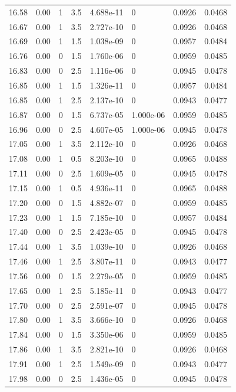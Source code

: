 \documentclass[preview]{standalone}
\begin{document}
{{{{{{{{\begin{tabular}{L{1.2cm}C{1.2cm} C{0.3cm}C{0.5cm} C{1.4cm}C{1.4cm} C{1.4cm}C{1.4cm}}
  16.58  &  0.00  & 1     & 3.5 &  4.688e-11  & 0  & 0.0926 &  0.0468   \\ 
  16.67  &  0.00  & 1     & 3.5 &  2.727e-10  & 0  & 0.0926 &  0.0468   \\ 
  16.69  &  0.00  & 1     & 1.5 &  1.038e-09  & 0  & 0.0957 &  0.0484   \\ 
  16.76  &  0.00  & 0     & 1.5 &  1.760e-06  & 0  & 0.0959 &  0.0485   \\ 
  16.83  &  0.00  & 0     & 2.5 &  1.116e-06  & 0  & 0.0945 &  0.0478   \\ 
  16.85  &  0.00  & 1     & 1.5 &  1.326e-11  & 0  & 0.0957 &  0.0484   \\ 
  16.85  &  0.00  & 1     & 2.5 &  2.137e-10  & 0  & 0.0943 &  0.0477   \\ 
  16.87  &  0.00  & 0     & 1.5 &  6.737e-05  & 1.000e-06  & 0.0959 &  0.0485   \\ 
  16.96  &  0.00  & 0     & 2.5 &  4.607e-05  & 1.000e-06  & 0.0945 &  0.0478   \\ 
  17.05  &  0.00  & 1     & 3.5 &  2.112e-10  & 0  & 0.0926 &  0.0468   \\ 
  17.08  &  0.00  & 1     & 0.5 &  8.203e-10  & 0  & 0.0965 &  0.0488   \\ 
  17.11  &  0.00  & 0     & 2.5 &  1.609e-05  & 0  & 0.0945 &  0.0478   \\ 
  17.15  &  0.00  & 1     & 0.5 &  4.936e-11  & 0  & 0.0965 &  0.0488   \\ 
  17.20  &  0.00  & 0     & 1.5 &  4.882e-07  & 0  & 0.0959 &  0.0485   \\ 
  17.23  &  0.00  & 1     & 1.5 &  7.185e-10  & 0  & 0.0957 &  0.0484   \\ 
  17.40  &  0.00  & 0     & 2.5 &  2.423e-05  & 0  & 0.0945 &  0.0478   \\ 
  17.44  &  0.00  & 1     & 3.5 &  1.039e-10  & 0  & 0.0926 &  0.0468   \\ 
  17.46  &  0.00  & 1     & 2.5 &  3.807e-11  & 0  & 0.0943 &  0.0477   \\ 
  17.56  &  0.00  & 0     & 1.5 &  2.279e-05  & 0  & 0.0959 &  0.0485   \\ 
  17.65  &  0.00  & 1     & 2.5 &  5.185e-11  & 0  & 0.0943 &  0.0477   \\ 
  17.70  &  0.00  & 0     & 2.5 &  2.591e-07  & 0  & 0.0945 &  0.0478   \\ 
  17.80  &  0.00  & 1     & 3.5 &  3.666e-10  & 0  & 0.0926 &  0.0468   \\ 
  17.84  &  0.00  & 0     & 1.5 &  3.350e-06  & 0  & 0.0959 &  0.0485   \\ 
  17.86  &  0.00  & 1     & 3.5 &  2.821e-10  & 0  & 0.0926 &  0.0468   \\ 
  17.91  &  0.00  & 1     & 2.5 &  1.549e-09  & 0  & 0.0943 &  0.0477   \\ 
  17.98  &  0.00  & 0     & 2.5 &  1.436e-05  & 0  & 0.0945 &  0.0478   \\ 
\hline 
\end{tabular} 

}}}}}}}}
\end{document}
